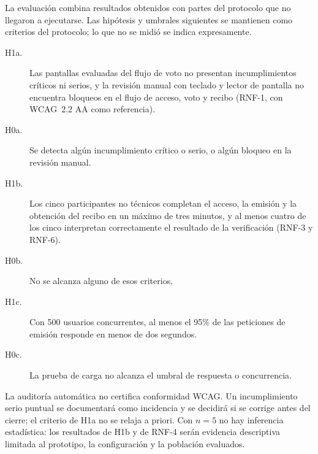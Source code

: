 La evaluación combina resultados obtenidos con partes del protocolo que no
llegaron a ejecutarse. Las hipótesis y umbrales siguientes se mantienen como
criterios del protocolo; lo que no se midió se indica expresamente.

\begin{description}
  \item[H1a.] Las pantallas evaluadas del flujo de voto no presentan
  incumplimientos críticos ni serios, y la revisión manual con teclado y
  lector de pantalla no encuentra bloqueos en el flujo de acceso, voto y
  recibo (RNF-1, con WCAG~2.2 AA como referencia).
  \item[H0a.] Se detecta algún incumplimiento crítico o serio, o algún bloqueo
  en la revisión manual.
  \item[H1b.] Los cinco participantes no técnicos completan el acceso, la
  emisión y la obtención del recibo en un máximo de tres minutos, y al menos
  cuatro de los cinco interpretan correctamente el resultado de la
  verificación (RNF-3 y RNF-6).
  \item[H0b.] No se alcanza alguno de esos criterios.
  \item[H1c.] Con 500 usuarios concurrentes, al menos el 95\% de las
  peticiones de emisión responde en menos de dos segundos.
  \item[H0c.] La prueba de carga no alcanza el umbral de respuesta o concurrencia.
\end{description}

La auditoría automática no certifica conformidad WCAG. Un incumplimiento
serio puntual se documentará como incidencia y se decidirá si se corrige antes
del cierre; el criterio de H1a no se relaja a priori. Con $n = 5$ no hay
inferencia estadística: los resultados de H1b y de RNF-4 serán evidencia
descriptiva limitada al prototipo, la configuración y la población evaluados.

